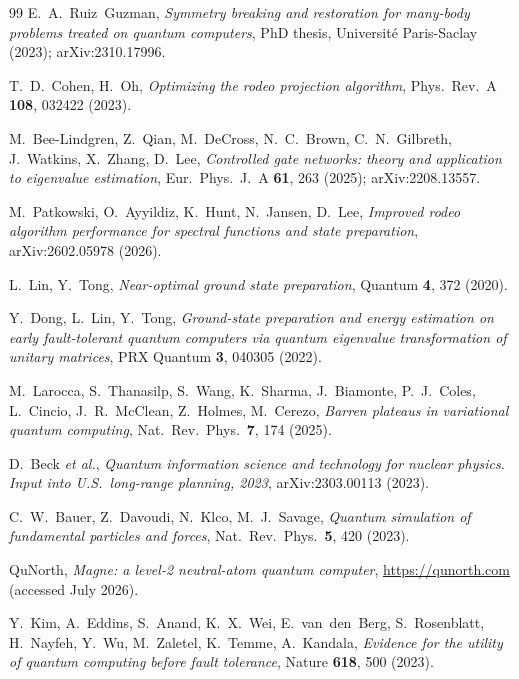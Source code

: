 \documentclass[
  aps,            %
  prc,            %
  reprint,        %
  superscriptaddress,
  floatfix,
  nofootinbib
]{revtex4-2}
\begin{document}
\begin{thebibliography}{99}
E.~A.~Ruiz~Guzman,
\textit{Symmetry breaking and restoration for many-body problems treated on
quantum computers},
PhD thesis, Universit\'e Paris-Saclay (2023); arXiv:2310.17996.

T.~D.~Cohen, H.~Oh,
\textit{Optimizing the rodeo projection algorithm},
Phys.\ Rev.\ A \textbf{108}, 032422 (2023).

M.~Bee-Lindgren, Z.~Qian, M.~DeCross, N.~C.~Brown, C.~N.~Gilbreth, J.~Watkins,
X.~Zhang, D.~Lee,
\textit{Controlled gate networks: theory and application to eigenvalue estimation},
Eur.\ Phys.\ J.\ A \textbf{61}, 263 (2025); arXiv:2208.13557.

M.~Patkowski, O.~Ayyildiz, K.~Hunt, N.~Jansen, D.~Lee,
\textit{Improved rodeo algorithm performance for spectral functions and state
preparation},
arXiv:2602.05978 (2026).

L.~Lin, Y.~Tong,
\textit{Near-optimal ground state preparation},
Quantum \textbf{4}, 372 (2020).

Y.~Dong, L.~Lin, Y.~Tong,
\textit{Ground-state preparation and energy estimation on early fault-tolerant
quantum computers via quantum eigenvalue transformation of unitary matrices},
PRX Quantum \textbf{3}, 040305 (2022).

M.~Larocca, S.~Thanasilp, S.~Wang, K.~Sharma, J.~Biamonte, P.~J.~Coles,
L.~Cincio, J.~R.~McClean, Z.~Holmes, M.~Cerezo,
\textit{Barren plateaus in variational quantum computing},
Nat.\ Rev.\ Phys.\ \textbf{7}, 174 (2025).

D.~Beck \textit{et al.},
\textit{Quantum information science and technology for nuclear physics.
Input into U.S.\ long-range planning, 2023},
arXiv:2303.00113 (2023).

C.~W.~Bauer, Z.~Davoudi, N.~Klco, M.~J.~Savage,
\textit{Quantum simulation of fundamental particles and forces},
Nat.\ Rev.\ Phys.\ \textbf{5}, 420 (2023).

QuNorth, \textit{Magne: a level-2 neutral-atom quantum computer},
\url{https://qunorth.com} (accessed July 2026).

Y.~Kim, A.~Eddins, S.~Anand, K.~X.~Wei, E.~van~den~Berg, S.~Rosenblatt,
H.~Nayfeh, Y.~Wu, M.~Zaletel, K.~Temme, A.~Kandala,
\textit{Evidence for the utility of quantum computing before fault tolerance},
Nature \textbf{618}, 500 (2023).


\end{thebibliography}
\end{document}
